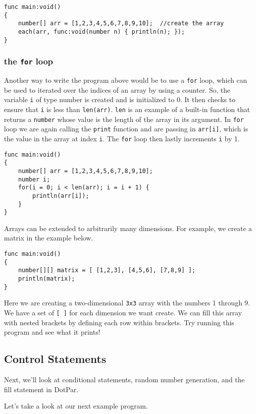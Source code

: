 \documentclass{article}
\begin{document}
\begin{verbatim}
func main:void()
{
    number[] arr = [1,2,3,4,5,6,7,8,9,10];  //create the array
    each(arr, func:void(number n) { println(n); });
}
\end{verbatim}

\subsubsection{the \verb!for! loop}
Another way to write the program above would be to use a \verb!for! loop, which can be used to iterated over the indices of an array by using a counter. So, the variable \verb!i! of type number is created and is initialized to 0. It then checks to ensure that \verb!i! is less than \verb!len(arr)!. \verb!len! is an example of a built-in function that returns a \verb!number! whose value is the length of the array in its argument. In \verb!for! loop we are again calling the \verb!print! function and are passing in \verb!arr[i]!, which is the value in the array at index \verb!i!. The \verb!for! loop then lastly increments \verb!i! by 1.

\begin{verbatim}
func main:void()
{
    number[] arr = [1,2,3,4,5,6,7,8,9,10];
    number i;
    for(i = 0; i < len(arr); i = i + 1) {
        println(arr[i]);
    }
}
\end{verbatim}

Arrays can be extended to arbitrarily many dimensions. For example, we create a matrix in the example below.

\begin{verbatim}
func main:void()
{
    number[][] matrix = [ [1,2,3], [4,5,6], [7,8,9] ];
    println(matrix);
}
\end{verbatim}

Here we are creating a two-dimensional \verb!3x3! array with the numbers 1 through 9.  We have a  set of \verb![ ]! for each dimension we want create.  We can fill this array with nested brackets by defining each row within brackets. Try running this program and see what it prints!

\subsection{Control Statements}

Next, we'll look at conditional statements, random number generation, and the fill statement in DotPar. 

Let's take a look at our next example program.
\end{document}
